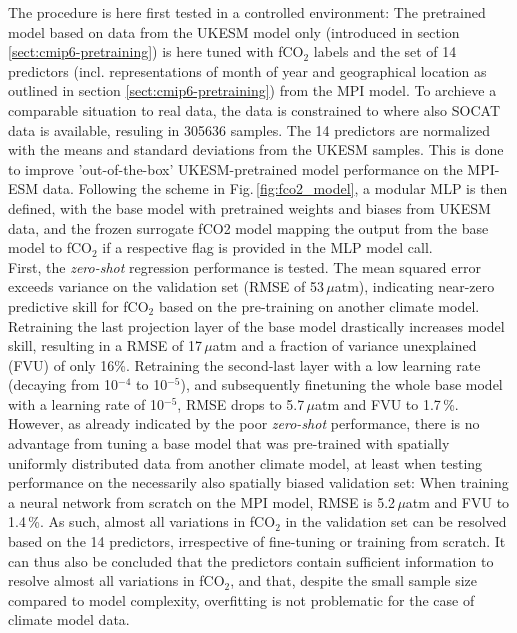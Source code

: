 \documentclass{article}
\begin{document}
	The procedure is here first tested in a controlled environment: The pretrained model based on data from the UKESM model only (introduced in section \ref{sect:cmip6-pretraining}) is here tuned with fCO$_2$ labels and the set of 14 predictors (incl. representations of month of year and geographical location as outlined in section \ref{sect:cmip6-pretraining}) from the MPI model. To archieve a comparable situation to real data, the data is constrained to where also SOCAT data is available, resuling in 305636 samples. The 14 predictors are normalized with the means and standard deviations from the UKESM samples. This is done to improve 'out-of-the-box' UKESM-pretrained model performance on the MPI-ESM data. Following the scheme in Fig.\,\ref{fig:fco2_model}, a modular MLP is then defined, with the base model with pretrained weights and biases from UKESM data, and the frozen surrogate fCO2 model mapping the output from the base model to fCO$_2$ if a respective flag is provided in the MLP model call. \\
	
	First, the \textit{zero-shot} regression performance is tested. The mean squared error exceeds variance on the validation set (RMSE of 53\,$\mu$atm), indicating near-zero predictive skill for fCO$_2$ based on the pre-training on another climate model. Retraining the last projection layer of the base model drastically increases model skill, resulting in a RMSE of 17\,$\mu$atm and a fraction of variance unexplained (FVU) of only 16\%. Retraining the second-last layer with a low learning rate (decaying from 10$^{-4}$ to 10$^{-5}$), and subsequently finetuning the whole base model with a learning rate of 10$^{-5}$, RMSE drops to 5.7\,$\mu$atm and FVU to 1.7\,\%. \\
	
	However, as already indicated by the poor \textit{zero-shot} performance, there is no advantage from tuning a base model that was pre-trained with spatially uniformly distributed data from another climate model, at least when testing performance on the necessarily also spatially biased validation set: When training a neural network from scratch on the MPI model, RMSE is 5.2\,$\mu$atm and FVU to 1.4\,\%. As such, almost all variations in fCO$_2$ in the validation set can be resolved based on the 14 predictors, irrespective of fine-tuning or training from scratch. It can thus also be concluded that the predictors contain sufficient information to resolve almost all variations in fCO$_2$, and that, despite the small sample size compared to model complexity, overfitting is not problematic for the case of climate model data. \\
	
\end{document}
